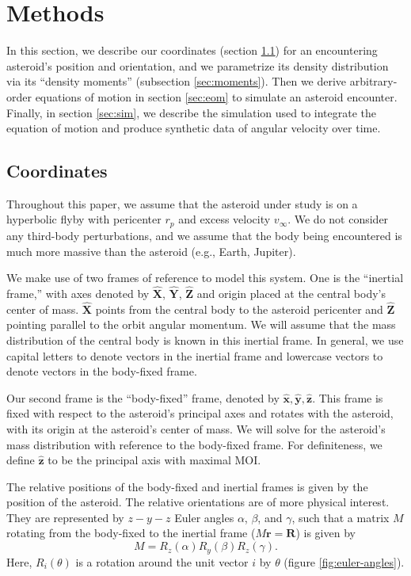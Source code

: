 \documentclass[fleqn,usenatbib]{mnras}
\newcommand{\unit}[1]{\bm{\hat{#1}}}
\begin{document}
\section{Methods}
\label{sec:methods}

In this section, we describe our coordinates (section \ref{sec:coordinates}) for an encountering asteroid's position and orientation, and we parametrize its density distribution via its ``density moments'' (subsection \ref{sec:moments}). Then we derive arbitrary-order equations of motion in section \ref{sec:eom} to simulate an asteroid encounter. Finally, in section \ref{sec:sim}, we describe the simulation used to integrate the equation of motion and produce synthetic data of angular velocity over time.

\subsection{Coordinates}
\label{sec:coordinates}

Throughout this paper, we assume that the asteroid under study is on a hyperbolic flyby with pericenter $r_p$ and excess velocity $v_\infty$. We do not consider any third-body perturbations, and we assume that the body being encountered is much more massive than the asteroid (e.g., Earth, Jupiter).

We make use of two frames of reference to model this system. One is the ``inertial frame,'' with axes denoted by $\unit{X}$, $\unit{Y}$, $\unit{Z}$ and origin placed at the central body's center of mass. $\unit{X}$ points from the central body to the asteroid pericenter and $\unit{Z}$ pointing parallel to the orbit angular momentum. We will assume that the mass distribution of the central body is known in this inertial frame. In general, we use capital letters to denote vectors in the inertial frame and lowercase vectors to denote vectors in the body-fixed frame.

Our second frame is the ``body-fixed'' frame, denoted by $\unit{x}, \unit{y}, \unit{z}$. This frame is fixed with respect to the asteroid's principal axes and rotates with the asteroid, with its origin at the asteroid's center of mass. We will solve for the asteroid's mass distribution with reference to the body-fixed frame. For definiteness, we define $\unit{z}$ to be the principal axis with maximal MOI.

The relative positions of the body-fixed and inertial frames is given by the position of the asteroid. The relative orientations are of more physical interest. They are represented by $z-y-z$ Euler angles $\alpha$, $\beta$, and $\gamma$, such that a matrix $M$ rotating from the body-fixed to the inertial frame ($M\bm{r} = \bm{R}$) is given by
\begin{equation}
M = R_z(\alpha) R_y(\beta) R_z(\gamma).
\label{eqn:euler-angles}
\end{equation}
Here, $R_i(\theta)$ is a rotation around the unit vector $i$ by $\theta$ (figure \ref{fig:euler-angles}).
\end{document}
